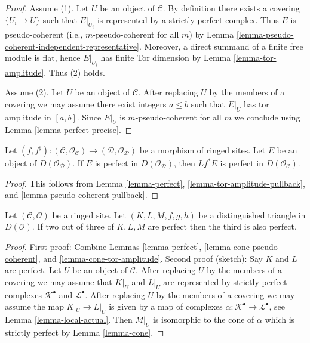 \begin{proof}
Assume (1). Let $U$ be an object of $\mathcal{C}$.
By definition there exists a covering $\{U_i \to U\}$ such that
$E|_{U_i}$ is represented by a strictly perfect complex.
Thus $E$ is pseudo-coherent (i.e., $m$-pseudo-coherent for all $m$) by
Lemma \ref{lemma-pseudo-coherent-independent-representative}.
Moreover, a direct summand of a finite free module is flat, hence
$E|_{U_i}$ has finite Tor dimension by
Lemma \ref{lemma-tor-amplitude}. Thus (2) holds.

\medskip\noindent
Assume (2). Let $U$ be an object of $\mathcal{C}$.
After replacing $U$ by the members of a covering
we may assume there exist integers $a \leq b$ such that $E|_U$
has tor amplitude in $[a, b]$. Since $E|_U$ is $m$-pseudo-coherent
for all $m$ we conclude using Lemma \ref{lemma-perfect-precise}.
\end{proof}

\begin{lemma}
\label{lemma-perfect-pullback}
Let $(f, f^\sharp) : (\mathcal{C}, \mathcal{O}_\mathcal{C}) \to
(\mathcal{D}, \mathcal{O}_\mathcal{D})$
be a morphism of ringed sites.
Let $E$ be an object of $D(\mathcal{O}_\mathcal{D})$.
If $E$ is perfect in $D(\mathcal{O}_\mathcal{D})$,
then $Lf^*E$ is perfect in $D(\mathcal{O}_\mathcal{C})$.
\end{lemma}

\begin{proof}
This follows from Lemma \ref{lemma-perfect},
\ref{lemma-tor-amplitude-pullback}, and
\ref{lemma-pseudo-coherent-pullback}.
\end{proof}

\begin{lemma}
\label{lemma-two-out-of-three-perfect}
Let $(\mathcal{C}, \mathcal{O})$ be a ringed site. Let $(K, L, M, f, g, h)$
be a distinguished triangle in $D(\mathcal{O})$. If two out of three of
$K, L, M$ are perfect then the third is also perfect.
\end{lemma}

\begin{proof}
First proof: Combine
Lemmas \ref{lemma-perfect}, \ref{lemma-cone-pseudo-coherent}, and
\ref{lemma-cone-tor-amplitude}.
Second proof (sketch): Say $K$ and $L$ are perfect. Let $U$ be an object
of $\mathcal{C}$. After replacing
$U$ by the members of a covering we may assume that $K|_U$ and $L|_U$
are represented by strictly perfect complexes $\mathcal{K}^\bullet$
and $\mathcal{L}^\bullet$. After replacing $U$ by the members
of a covering we may assume the map $K|_U \to L|_U$ is given by
a map of complexes $\alpha : \mathcal{K}^\bullet \to \mathcal{L}^\bullet$,
see Lemma \ref{lemma-local-actual}.
Then $M|_U$ is isomorphic to the cone of $\alpha$ which is strictly
perfect by Lemma \ref{lemma-cone}.
\end{proof}

